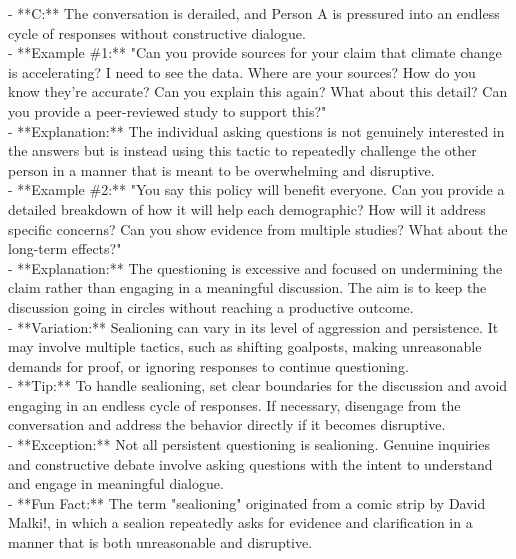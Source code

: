 \documentclass[a4paper,12pt,single,pdftex]{scrartcl}
\begin{document}
    
        - **C:** The conversation is derailed, and Person A is pressured into an endless cycle of responses without constructive dialogue.
    \\

    
      - **Example \#1:** "Can you provide sources for your claim that climate change is accelerating? I need to see the data. Where are your sources? How do you know they’re accurate? Can you explain this again? What about this detail? Can you provide a peer-reviewed study to support this?"
    \\

    
      - **Explanation:** The individual asking questions is not genuinely interested in the answers but is instead using this tactic to repeatedly challenge the other person in a manner that is meant to be overwhelming and disruptive.
    \\

    
      - **Example \#2:** "You say this policy will benefit everyone. Can you provide a detailed breakdown of how it will help each demographic? How will it address specific concerns? Can you show evidence from multiple studies? What about the long-term effects?"
    \\

    
      - **Explanation:** The questioning is excessive and focused on undermining the claim rather than engaging in a meaningful discussion. The aim is to keep the discussion going in circles without reaching a productive outcome.
    \\

    
      - **Variation:** Sealioning can vary in its level of aggression and persistence. It may involve multiple tactics, such as shifting goalposts, making unreasonable demands for proof, or ignoring responses to continue questioning.
    \\

    
      - **Tip:** To handle sealioning, set clear boundaries for the discussion and avoid engaging in an endless cycle of responses. If necessary, disengage from the conversation and address the behavior directly if it becomes disruptive.
    \\

    
      - **Exception:** Not all persistent questioning is sealioning. Genuine inquiries and constructive debate involve asking questions with the intent to understand and engage in meaningful dialogue.
    \\

    
      - **Fun Fact:** The term "sealioning" originated from a comic strip by David Malki!, in which a sealion repeatedly asks for evidence and clarification in a manner that is both unreasonable and disruptive.
    \\
\end{document}
